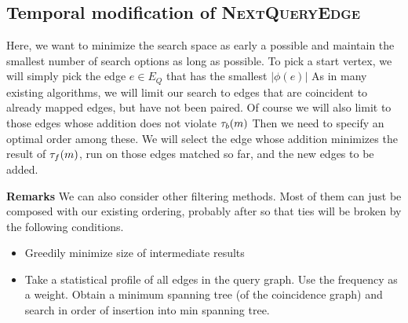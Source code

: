 \subsection{Temporal modification of \textsc{NextQueryEdge}}
\label{sec:next_query_edge}

Here, we want to minimize the search space as early a possible and maintain the
smallest number of search options as long as possible. To pick a start vertex,
we will simply pick the edge $e \in E_Q$ that has the smallest $|\phi(e)|$ As in
many existing algorithms, \cite{2004-PAMI-VF2, 2009-EDBT-GADDI,
  2008-SIGMOD-GraphQL} we will limit our search to edges that are coincident to
already mapped edges, but have not been paired. Of course we will also limit to
those edges whose addition does not violate $\tau_b(m)$ Then we need to
specify an optimal order among these.  We will select the edge whose addition
minimizes the result of $\tau_f(m)$, run on those edges matched so far, and
the new edges to be added.

\textbf{Remarks}
We can also consider other filtering methods.  Most of them can just be composed
with our existing ordering, probably after so that ties will be broken by the
following conditions.
\begin{itemize}
  \item Greedily minimize size of intermediate results \cite{2008-SIGMOD-GraphQL} 
  \item Take a statistical profile of all edges in the query graph. Use the
    frequency as a weight. Obtain a minimum spanning tree (of the coincidence
    graph) and search in order of insertion into min spanning
    tree. \cite{2008-VLDB-QuickSI}
\end{itemize}
